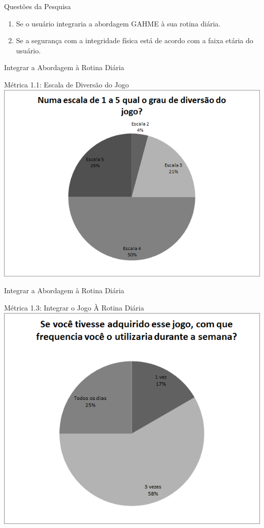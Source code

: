 \documentclass{beamer}
\begin{document}
\begin{frame}{Questões da Pesquisa} 
    \begin{block}{}
			\begin{enumerate}
				\item Se o usuário integraria a abordagem GAHME à sua rotina diária.
				\item Se a segurança com a integridade física está de acordo com a faixa etária do usuário.
			\end{enumerate}
    \end{block}
\end{frame}

\begin{frame}{Integrar a Abordagem à Rotina Diária} 
    \begin{block}{Métrica 1.1: Escala de Diversão do Jogo}
			\center \includegraphics[height=2.6 in]{img/chart_1-.png}
    \end{block}
\end{frame}

\begin{frame}{Integrar a Abordagem à Rotina Diária} 
    \begin{block}{Métrica 1.3: Integrar o Jogo À Rotina Diária}
			\center \includegraphics[height=2.6 in]{img/chart_3-.png}
    \end{block}
\end{frame}
\end{document}
